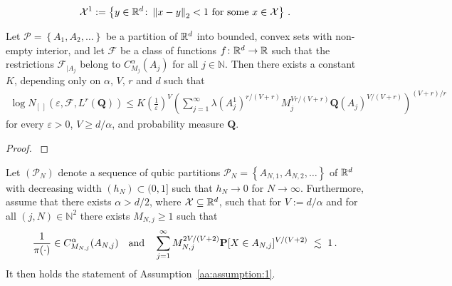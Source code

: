 \begin{gather*}
  \mathcal{X}^1
  :=
  \left\{ 
    y\in\R^d
    \colon
    \norm{x-y}_2 <1
    \ 
    \text{for some}\ x\in\mathcal{X}
  \right\}
  \,.
\end{gather*}
\begin{lemma}
  \label{vdv_coro}
  Let $\mathcal{P}=\left\{ A_1,A_2,\ldots \right\}$ be a partition of $\mathbb{R}^d$ into bounded, convex sets with non-empty interior, and let $\mathcal{F}$ be a class of functions $f\colon\mathbb{R}^d\to\mathbb{R}$ such that the restrictions $\mathcal{F}_{|A_j}$ belong to $C^\alpha_{M_j}(A_j)$
  for all $j\in\mathbb{N}$.
  Then there exists a constant $K$, depending only on $\alpha$, $V$, $r$ and $d$
  such that
  \begin{gather}
    \label{667}
    \log
    N_{[\,]}
    (
    \varepsilon
    ,
    \mathcal{F}
    ,
    L^r(\mathbf{Q})
    )
    \le
    K
    \left( \frac{1}{\varepsilon} \right)^V
    \left( 
      \sum_{j=1}^{\infty}
      \lambda(A_j^1)^{r/(V+r)}
      M_j^{Vr/(V+r)}
      \mathbf{Q}(A_j)^{V/(V+r)}
    \right)
    ^{(V+r)/r}
  \end{gather}
  for every $\varepsilon>0$, $V\ge d/\alpha$, and probability measure $\mathbf{Q}$.
\end{lemma}
\begin{proof}
  \emph{\cite[Corollary~2.7.4]{vaart2013}}
\end{proof}
\pagebreak
\begin{lemma}
  Let $(\mathcal{P}_N)$ denote a sequence of qubic partitions
  $\mathcal{P}_N=\left\{ A_{N,1},A_{N,2},\ldots \right\}$ 
  of $\mathbb{R}^d$ 
  with decreasing width $(h_N)\subset(0,1]$ such that $h_N\to 0$ for $N\to\infty$.
  Furthermore, assume that there exists
  $\alpha>d/2$, where $\mathcal{X}\subseteq \mathbb{R}^d$, such
  that for 
  $V:=d/\alpha$
 and for all 
$
(j,N)\in\mathbb{N}^2
$
there exists 
$M_{N,j}\ge 1$ such that 
\begin{gather}
  \label{897}
  \frac{1}{\pi(\cdot)}
  \in C^\alpha_{M_{N,j}}(A_{N,j})
  \quad
  \text{and}
  \quad
  \sum_{j=1}^{\infty} 
  M_{N,j}^{2V/(V+2)}
  \P
  [
  X\in A_{N,j}
  ]^{V/(V+2)}
  \ 
  \lesssim
  \ 
  1
  \,.
\end{gather}
It then holds the statement of Assumption~\ref{aa:assumption:1}.
\end{lemma}
